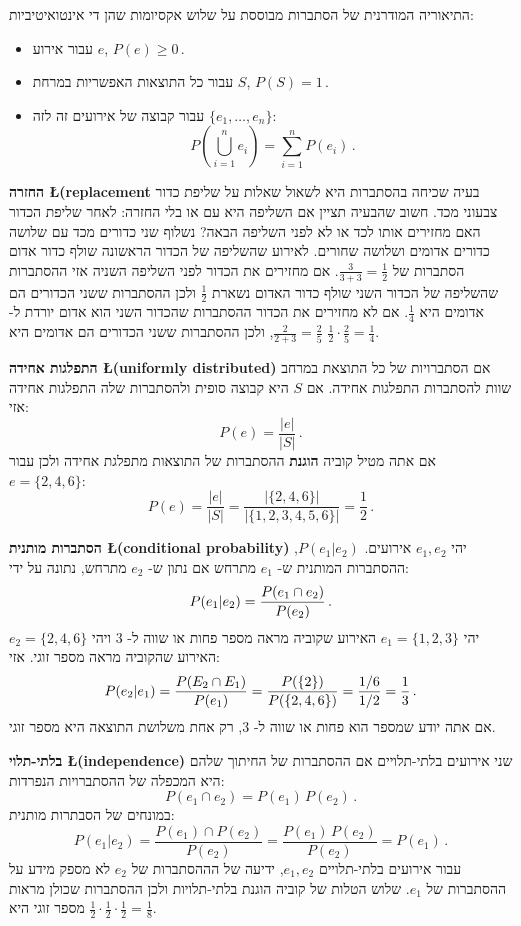 התיאוריה המודרנית של הסתברות מבוססת על שלוש אקסיומות שהן די אינטואיטיביות:
\begin{itemize}
\item 
עבור אירוע
$e$, $P(e) \geq 0\,$.\label{p.first-axiom}
\item 
עבור כל התוצאות האפשריות במרחת 
$S$, $P(S) = 1\,$.
\item
עבור קבוצה של אירועים זה לזה
$\{e_1,\ldots,e_n\}$:
\[
P\left(\bigcup_{i=1}^{n} e_i\right)=\sum_{i=1}^{n} P(e_i)\,.
\]
\end{itemize}

\textbf{החזרה \L{\small (replacement}}
בעיה שכיחה בהסתברות היא לשאול שאלות על שליפת כדור צבעוני מכד. חשוב שהבעיה תציין אם השליפה היא עם או בלי החזרה: לאחר שליפת הכדור האם מחזירים אותו לכד או לא לפני השליפה הבאה? נשלוף שני כדורים מכד עם שלושה כדורים אדומים ושלושה שחורים. לאירוע שהשליפה של הכדור הראשונה שולף כדור אדום הסתברות של
$\frac{3}{3+3}=\frac{1}{2}$.
אם מחזירים את הכדור לפני השליפה השניה אזי ההסתברות שהשליפה של הכדור השני שולף כדור האדום נשארת 
$\frac{1}{2}$
ולכן ההסתברות ששני הכדורים הם אדומים היא
$\frac{1}{4}$.
אם לא מחזירים את הכדור ההסתברות שהכדור השני הוא אדום יורדת ל-%
$\frac{2}{2+3}=\frac{2}{5}$,
ולכן ההסתברות ששני הכדורים הם אדומים היא
$\frac{1}{2}\cdot\frac{2}{5}=\frac{1}{4}$.

\textbf{התפלגות אחידה \L{\small (uniformly distributed)}} 
אם הסתברויות של כל התוצאת במרחב שוות להסתברות התפלגות אחידה. אם 
$S$
היא קבוצה סופית ולהסתברות שלה התפלגות אחידה אזי:
\[
P(e)=\frac{|e|}{|S|}\,.
\]
אם אתה מטיל קוביה
\textbf{הוגנת}
ההסתברות של התוצאות מתפלגת אחידה ולכן עבור
$e=\{2,4,6\}$:
\[
P(e) = \frac{|e|}{|S|} = \frac{|\{2,4,6\}|}{|\{1,2,3,4,5,6\}|}=\frac{1}{2}\,.
\]

\textbf{הסתברות מותנית \L{\small (conditional probability)}} 
יהי 
$e_1,e_2$
אירועים. 
$P(e_1 | e_2)$,
ההסתברות המותנית ש-%
$e_1$
מתרחש אם נתון ש-%
$e_2$
מתרחש, נתונה על ידי:
\[
P(e_1 | e_2) = \displaystyle\frac{P(e_1 \cap e_2)}{P(e_2)}\,.
\]
יהי 
$e_1=\{1,2,3\}$
האירוע שקוביה מראה מספר פחות או שווה ל-%
$3$
ויהי
$e_2=\{2,4,6\}$
האירוע שהקוביה מראה מספר זוגי. אזי:
\[
P(e_2 | e_1) = \displaystyle\frac{P(E_2 \cap E_1)}{P(e_1)}=\displaystyle\frac{P(\{2\})}{P(\{2,4,6\})}= \displaystyle\frac{1/6}{1/2}=\displaystyle\frac{1}{3}\,.
\]
אם אתה יודע שמספר הוא פחות או שווה ל-%
$3$,
רק אחת משלושת התוצאה היא מספר זוגי.

\textbf{בלתי-תלוי \L{\small (independence)}}
שני אירועים בלתי-תלויים אם ההסתברות של החיתוך שלהם היא המכפלה של ההסתברויות הנפרדות:
\[
P(e_1 \cap e_2)=P(e_1)\,P(e_2)\,.
\]
במונחים של הסבתרות מותנית:
\[
P(e_1 | e_2)=\frac{P(e_1)\cap P(e_2)}{P(e_2)} = \frac{P(e_1)\,P(e_2)}{P(e_2)}=P(e_1)\,. 
\]
עבור אירועים בלתי-תלויים
$e_1,e_2$,
ידיעה של הההסתברות של
$e_2$
לא מספק מידע על ההסתברות של
$e_1$.
שלוש הטלות של קוביה הוגנת בלתי-תלויות ולכן ההסתברות שכולן מראות מספר זוגי היא
$\frac{1}{2}\cdot \frac{1}{2}\cdot \frac{1}{2}=\frac{1}{8}$. 

